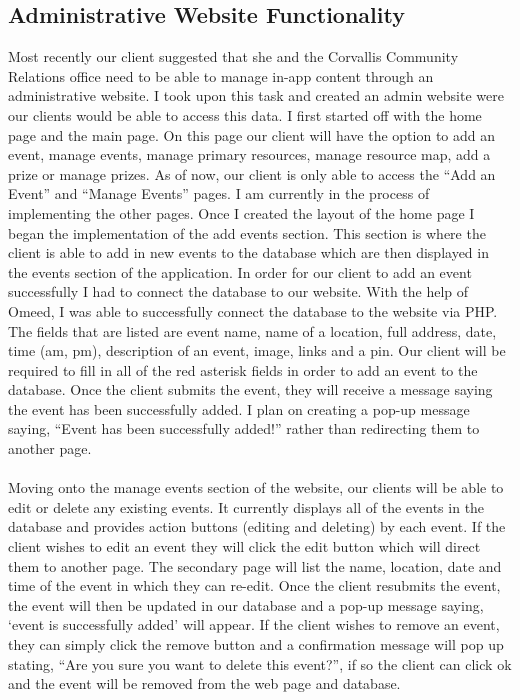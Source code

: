 \documentclass[draftclsnofoot, onecolumn, 10pt, compsoc]{IEEEtran}
\begin{document}
      \subsection{Administrative Website Functionality}
         Most recently our client suggested that she and the Corvallis Community Relations office need to be able to manage in-app content through an administrative website. I took upon this task and created an admin website were our clients would be able to access this data. I first started off with the home page and the main page. On this page our client will have the option to add an event, manage events, manage primary resources, manage resource map, add a prize or manage prizes. As of now, our client is only able to access the “Add an Event” and “Manage Events” pages. I am currently in the process of implementing the other pages. Once I created the layout of the home page I began the implementation of the add events section. This section is where the client is able to add in new events to the database which are then displayed in the events section of the application. In order for our client to add an event successfully I had to connect the database to our website. With the help of Omeed, I was able to successfully connect the database to the website via PHP. The fields that are listed are event name, name of a location, full address, date, time (am, pm), description of an event, image, links and a pin. Our client will be required to fill in all of the red asterisk fields in order to add an event to the database. Once the client submits the event, they will receive a message saying the event has been successfully added. I plan on creating a pop-up message saying, “Event has been successfully added!” rather than redirecting them to another page. \\ \\
         Moving onto the manage events section of the website, our clients will be able to edit or delete any existing events. It currently displays all of the events in the database and provides action buttons (editing and deleting) by each event. If the client wishes to edit an event they will click the edit button which will direct them to another page. The secondary page will list the name, location, date and time of the event in which they can re-edit. Once the client resubmits the event, the event will then be updated in our database and a pop-up message saying, ‘event is successfully added’ will appear. If the client wishes to remove an event, they can simply click the remove button and a confirmation message will pop up stating, “Are you sure you want to delete this event?”, if so the client can click ok and the event will be removed from the web page and database. \\ \\
\end{document}
